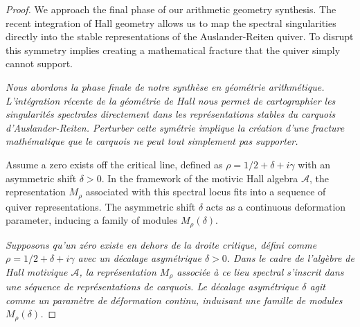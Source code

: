\documentclass[11pt,a4paper]{article}
\theoremstyle{definition}
\begin{document}
\begin{proof}
We approach the final phase of our arithmetic geometry synthesis. The recent integration of Hall geometry allows us to map the spectral singularities directly into the stable representations of the Auslander-Reiten quiver. To disrupt this symmetry implies creating a mathematical fracture that the quiver simply cannot support.

\textit{Nous abordons la phase finale de notre synthèse en géométrie arithmétique. L'intégration récente de la géométrie de Hall nous permet de cartographier les singularités spectrales directement dans les représentations stables du carquois d'Auslander-Reiten. Perturber cette symétrie implique la création d'une fracture mathématique que le carquois ne peut tout simplement pas supporter.}

Assume a zero exists off the critical line, defined as $\rho = 1/2 + \delta + i\gamma$ with an asymmetric shift $\delta > 0$. In the framework of the motivic Hall algebra $\mathcal{A}$, the representation $M_{\rho}$ associated with this spectral locus fits into a sequence of quiver representations. The asymmetric shift $\delta$ acts as a continuous deformation parameter, inducing a family of modules $M_{\rho}(\delta)$.

\textit{Supposons qu'un zéro existe en dehors de la droite critique, défini comme $\rho = 1/2 + \delta + i\gamma$ avec un décalage asymétrique $\delta > 0$. Dans le cadre de l'algèbre de Hall motivique $\mathcal{A}$, la représentation $M_{\rho}$ associée à ce lieu spectral s'inscrit dans une séquence de représentations de carquois. Le décalage asymétrique $\delta$ agit comme un paramètre de déformation continu, induisant une famille de modules $M_{\rho}(\delta)$.}


\end{proof}
\end{document}
